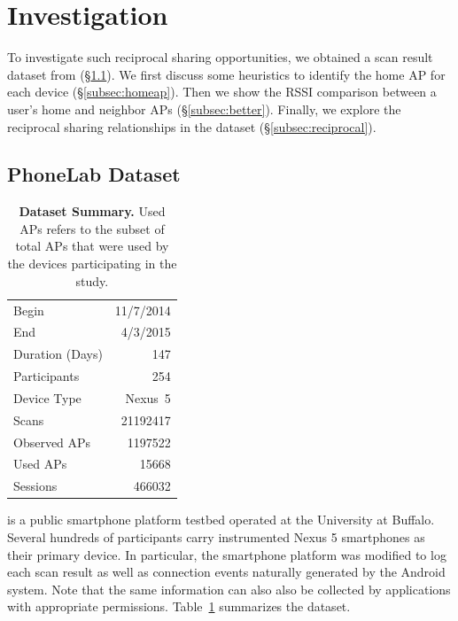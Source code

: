 \newpage
\clearpage

\section{Investigation}
\label{sec:investigation}

To investigate such reciprocal sharing opportunities, we obtained a \wifi{} scan
result dataset from \PhoneLab{} (\S\ref{subsec:phonelab}). We first discuss some
heuristics to identify the home AP for each device
(\S\ref{subsec:homeap}). Then we show the RSSI comparison between a user's home
and neighbor APs (\S\ref{subsec:better}). Finally, we explore the reciprocal
sharing relationships in the dataset (\S\ref{subsec:reciprocal}).

\subsection{PhoneLab \wifi{} Dataset}
\label{subsec:phonelab}

\begin{table}[t]
  \begin{tabularx}{\columnwidth}{Xr}
    \toprule
    Begin & 11/7/2014 \\ 
    End & 4/3/2015 \\ 
    Duration (Days) & 147 \\ \midrule
    Participants & 254 \\
    Device Type & Nexus~5 \\ \midrule
    Scans & \num{21192417} \\
    Observed APs & \num{1197522} \\
    Used APs & \num{15668} \\ \midrule
    \wifi{} Sessions & \num{466032} \\
    \bottomrule
  \end{tabularx}
  \caption{\textbf{\PhoneLab{} \wifi{} Dataset Summary.} Used APs refers to the
  subset of total APs that were used by the devices participating in the study.}
  \label{tab:summary}
\end{table}

\PhoneLab{}\cite{phonelab-sensemine13} is a public smartphone platform testbed
operated at the University at Buffalo. Several hundreds of participants carry
instrumented Nexus 5 smartphones as their primary device. In particular, the
smartphone platform was modified to log each \wifi{} scan result as well as
connection events naturally generated by the Android system. Note that the same
information can also also be collected by applications with appropriate permissions.
Table~\ref{tab:summary} summarizes the \PhoneLab{} \wifi{} dataset.

